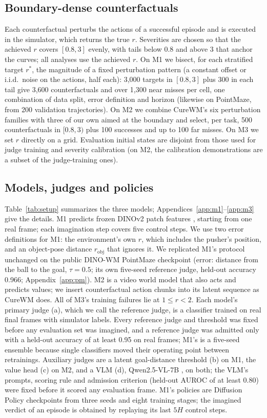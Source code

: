 \documentclass[10pt]{article}
\newcommand{\rob}{r_{\mathrm{obj}}}
\begin{document}
\subsection{Boundary-dense counterfactuals}
Each counterfactual perturbs the actions of a successful episode and is executed in the simulator, which returns the true $r$. Severities are chosen so that the achieved $r$ covers $[0.8,3]$ evenly, with tails below 0.8 and above 3 that anchor the curves; all analyses use the achieved $r$. On M1 we bisect, for each stratified target $r^*$, the magnitude of a fixed perturbation pattern (a constant offset or i.i.d.\ noise on the actions, half each): 3,000 targets in $[0.8,3]$ plus 300 in each tail give 3,600 counterfactuals and over 1,300 near misses per cell, one combination of data split, error definition and horizon (likewise on PointMaze, from 200 validation trajectories). On M2 we combine CureWM's six perturbation families \citep{xu2026curewm} with three of our own aimed at the boundary and select, per task, 500 counterfactuals in $[0.8,3)$ plus 100 successes and up to 100 far misses. On M3 we set $r$ directly on a grid. Evaluation initial states are disjoint from those used for judge training and severity calibration (on M2, the calibration demonstrations are a subset of the judge-training ones).

\subsection{Models, judges and policies}
Table~\ref{tab:setup} summarizes the three models; Appendices~\ref{app:m1}--\ref{app:m3} give the details. M1 predicts frozen DINOv2 patch features \citep{oquab2024dinov2}, starting from one real frame; each imagination step covers five control steps. We use two error definitions for M1: the environment's own $r$, which includes the pusher's position, and an object-pose distance $\rob$ that ignores it. We replicated M1's protocol unchanged on the public DINO-WM PointMaze checkpoint (error: distance from the ball to the goal, $\tau=0.5$; its own five-seed reference judge, held-out accuracy 0.966; Appendix~\ref{app:pm}). M2 is a video world model that also acts and predicts values; we insert counterfactual action chunks into its latent sequence as CureWM does. All of M3's training failures lie at $1\le r<2$. Each model's primary judge (a), which we call the reference judge, is a classifier trained on real final frames with simulator labels. Every reference judge and threshold was fixed before any evaluation set was imagined, and a reference judge was admitted only with a held-out accuracy of at least 0.95 on real frames; M1's is a five-seed ensemble \citep{lakshminarayanan2017deepensembles} because single classifiers moved their operating point between retrainings. Auxiliary judges are a latent goal-distance threshold (b) on M1, the value head (c) on M2, and a VLM (d), Qwen2.5-VL-7B \citep{bai2025qwen25vl}, on both; the VLM's prompts, scoring rule and admission criterion (held-out AUROC of at least 0.80) were fixed before it scored any evaluation frame. M1's policies are Diffusion Policy \citep{chi2023diffusionpolicy} checkpoints from three seeds and eight training stages; the imagined verdict of an episode is obtained by replaying its last $5H$ control steps.
\end{document}
